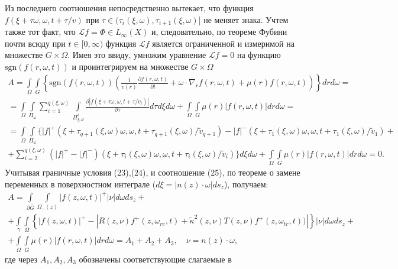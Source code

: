 \documentclass[12pt,reqno]{report}
\def\sgn{\mathrm{sgn}}
\begin{document}
Из последнего соотношения непосредственно вытекает, что функция
$f(\xi+\tau\omega,\omega,t+\tau/v)$ при $\tau \in
(\tau_i(\xi,\omega), \tau_{i+1}(\xi,\omega)]$ не меняет знака. 
Учтем также тот факт, что ${\mathcal L f} = \Phi \in L_{\infty}(X)$ и,
следовательно, по теореме Фубини почти всюду при $t\in[0,\infty)$
функция ${\mathcal L f}$ является ограниченной и измеримой на
множестве $G\times \Omega$.
Имея это
ввиду, умножим уравнение ${\mathcal L}f=0$ на функцию $ {\sgn}
(f(r,\omega,t))$ и проинтегрируем на множестве $G\times \Omega$
\begin{multline}
A=\int \limits_{\Omega} \int \limits_G \left \{ {\sgn}
(f(r,\omega,t))\left(\frac{1}{v(r)} \frac{\partial
	f(r,\omega,t)}{\partial t} +\omega \cdot \nabla_r f(r,\omega,t) +
\mu (r) f(r,\omega,t)\right)\right \}
dr d\omega=
\\
= \int \limits_{\Omega} \int \limits_{\Pi_{\omega}} \sum
\limits^{q(\xi,\omega)}_{i=1} \int \limits_{\Pi^i_{\xi,\omega}}
\frac{\partial |f(\xi+\tau\omega,\omega,t+\tau/\tilde{v}_i)|}{\partial \tau}
d\tau d \xi d \omega +\int \limits_{\Omega} \int \limits_G \mu (r)
|f(r,\omega,t)|
dr d\omega= \\
=
\int \limits_{\Omega} \int \limits_{\Pi_{\omega}}\{
|f|^+(\xi+\tau_{q+1}
(\xi,\omega) \omega,\omega,t+\tau_{q+1}(\xi,\omega)/\tilde{v}_{q+1}) -
|f|^-(\xi+\tau_{1} (\xi,\omega) \omega,\omega,t+\tau_{1}(\xi,\omega)/\tilde{v}_{1})
+
\\+
\sum \limits^{q(\xi,\omega)}_{i=2}
(|f|^+ - |f|^-)(\xi+\tau_i (\xi,\omega)
\omega,\omega, t+\tau_i (\xi,\omega)/\tilde{v}_i)\} d\xi d\omega + \int
\limits_{\Omega} \int \limits_G \mu(r) |f(r,\omega,t)| dr d\omega
= 0.
\end{multline}
Учитывая граничные условия (23),(24), и соотношение (25), по
теореме о замене переменных в поверхностном интеграле ($ d\xi =
|n(z) \cdot \omega| d s_z$), получаем:
\begin{multline}
A =
\int \limits_{\partial \overline{G}} \int \limits_{\Omega_-(z)}
|f(z,\omega,t)|^+ |\nu | d \omega d s_z
+
\\+
\int \limits_{\gamma} \int \limits_{\Omega} \left
\{|f(z,\omega,t)|^+ - |R(z,\nu ) f^+(z,\omega_{re},t) +
\widetilde{\kappa}^2(z,\nu )T(z,\nu )
f^+(z,\omega_{tr},t) ) | \right\} |\nu |d\omega d s_z +\\
+ \int \limits_{\Omega} \int
\limits_G \mu(r) |f(r,\omega,t)| dr d\omega =A_1 +A_2 +A_3, \quad
\nu = n(z)\cdot \omega,
\end{multline}
где через $A_1, A_2, A_3$ обозначены соответствующие слагаемые в
\end{document}
